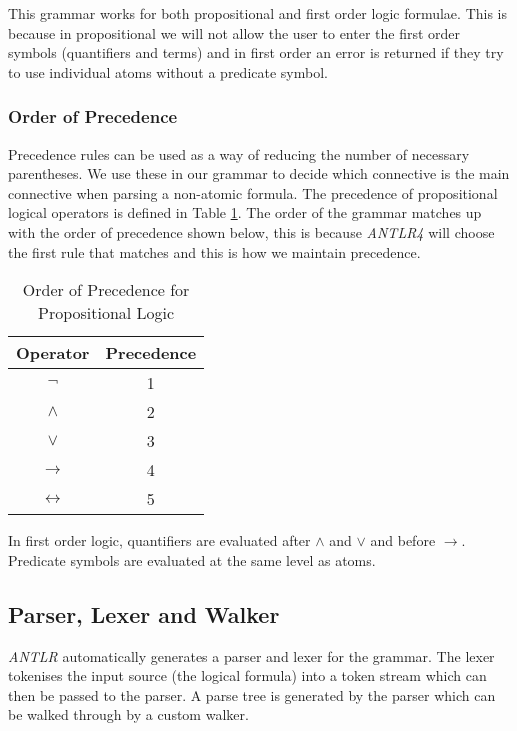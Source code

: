 \documentclass[draft]{report}
\begin{document}
This grammar works for both propositional and first order logic formulae. This is because in propositional we will not allow the user to enter the first order symbols (quantifiers and terms) and in first order an error is returned if they try to use individual atoms without a predicate symbol.

\subsubsection{Order of Precedence}

Precedence rules can be used as a way of reducing the number of necessary parentheses. We use these in our grammar to decide which connective is the main connective when parsing a non-atomic formula. The precedence of propositional logical operators is defined in Table \ref{orderofprecendence}. The order of the grammar matches up with the order of precedence shown below, this is because \emph{ANTLR4} will choose the first rule that matches and this is how we maintain precedence.

\begin{table}[h]
\begin{center}
\begin{tabular}{| c | c |}
    \hline
    Operator & Precedence \\ \hline 
    $\lnot$  & 1 \\
    $\land$  & 2 \\
    $\lor$   & 3 \\
    $\to$    & 4 \\
    $\leftrightarrow$ & 5 \\ \hline
\end{tabular}
\caption{Order of Precedence for Propositional Logic}
\label{orderofprecendence}
\end{center}
\end{table}

In first order logic, quantifiers are evaluated after $\land$ and $\lor$ and before $\rightarrow$. Predicate symbols are evaluated at the same level as atoms.

\subsection{Parser, Lexer and Walker}
\label{sub:walker}

\emph{ANTLR} automatically generates a parser and lexer for the grammar. The lexer tokenises the input source (the logical formula) into a token stream which can then be passed to the parser. A parse tree is generated by the parser which can be walked through by a custom walker. 
\end{document}
